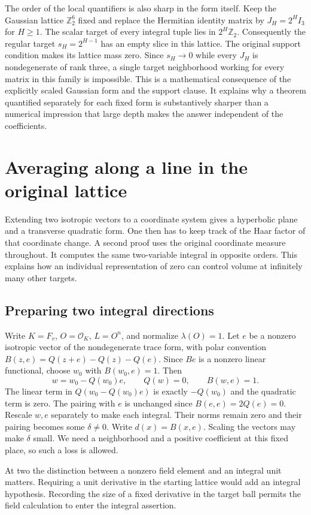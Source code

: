 \documentclass[12pt,letterpaper]{article}
\begin{document}
The order of the local quantifiers is also sharp in the form itself. Keep the Gaussian lattice $\mathbb Z_2^6$ fixed and replace the Hermitian identity matrix by $J_H=2^H I_3$ for $H\ge1$. The scalar target of every integral tuple lies in $2^H\mathbb Z_2$. Consequently the regular target $s_H=2^{H-1}$ has an empty slice in this lattice. The original support condition makes its lattice mass zero. Since $s_H\to0$ while every $J_H$ is nondegenerate of rank three, a single target neighborhood working for every matrix in this family is impossible. This is a mathematical consequence of the explicitly scaled Gaussian form and the support clause. It explains why a theorem quantified separately for each fixed form is substantively sharper than a numerical impression that large depth makes the answer independent of the coefficients.

\section{Averaging along a line in the original lattice}
Extending two isotropic vectors to a coordinate system gives a hyperbolic plane and a transverse quadratic form. One then has to keep track of the Haar factor of that coordinate change. A second proof uses the original coordinate measure throughout. It computes the same two-variable integral in opposite orders. This explains how an individual representation of zero can control volume at infinitely many other targets.
\subsection{Preparing two integral directions}
Write $K=F_v$, $O=\mathcal O_K$, $L=O^n$, and normalize $\lambda(O)=1$. Let $e$ be a nonzero isotropic vector of the nondegenerate trace form, with polar convention $B(z,e)=Q(z+e)-Q(z)-Q(e)$. Since $Be$ is a nonzero linear functional, choose $w_0$ with $B(w_0,e)=1$. Then
\[
 w=w_0-Q(w_0)e,\qquad Q(w)=0,\qquad B(w,e)=1.
\]
The linear term in $Q(w_0-Q(w_0)e)$ is exactly $-Q(w_0)$ and the quadratic term is zero. The pairing with $e$ is unchanged since $B(e,e)=2Q(e)=0$. Rescale $w,e$ separately to make each integral. Their norms remain zero and their pairing becomes some $\delta\ne0$. Write $d(x)=B(x,e)$. Scaling the vectors may make $\delta$ small. We need a neighborhood and a positive coefficient at this fixed place, so such a loss is allowed.
\par
At two the distinction between a nonzero field element and an integral unit matters. Requiring a unit derivative in the starting lattice would add an integral hypothesis. Recording the size of a fixed derivative in the target ball permits the field calculation to enter the integral assertion.
\end{document}
